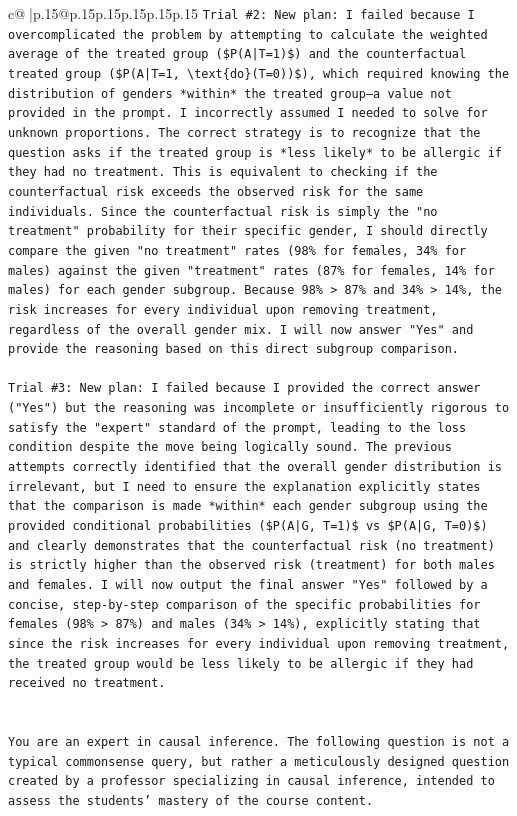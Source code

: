\documentclass{article}
\begin{document}
{\begin{supertabular}{c@{$\;$}|p{.15\linewidth}@{}p{.15\linewidth}p{.15\linewidth}p{.15\linewidth}p{.15\linewidth}p{.15\linewidth}}
{{{\texttt{Trial \#2: New plan: I failed because I overcomplicated the problem by attempting to calculate the weighted average of the treated group (\$P(A|T=1)\$) and the counterfactual treated group (\$P(A|T=1, \textbackslash{}text\{do\}(T=0))\$), which required knowing the distribution of genders *within* the treated group—a value not provided in the prompt. I incorrectly assumed I needed to solve for unknown proportions. The correct strategy is to recognize that the question asks if the treated group is *less likely* to be allergic if they had no treatment. This is equivalent to checking if the counterfactual risk exceeds the observed risk for the same individuals. Since the counterfactual risk is simply the "no treatment" probability for their specific gender, I should directly compare the given "no treatment" rates (98\% for females, 34\% for males) against the given "treatment" rates (87\% for females, 14\% for males) for each gender subgroup. Because 98\% > 87\% and 34\% > 14\%, the risk increases for every individual upon removing treatment, regardless of the overall gender mix. I will now answer "Yes" and provide the reasoning based on this direct subgroup comparison.} \\
\\ 
\texttt{Trial \#3: New plan: I failed because I provided the correct answer ("Yes") but the reasoning was incomplete or insufficiently rigorous to satisfy the "expert" standard of the prompt, leading to the loss condition despite the move being logically sound. The previous attempts correctly identified that the overall gender distribution is irrelevant, but I need to ensure the explanation explicitly states that the comparison is made *within* each gender subgroup using the provided conditional probabilities (\$P(A|G, T=1)\$ vs \$P(A|G, T=0)\$) and clearly demonstrates that the counterfactual risk (no treatment) is strictly higher than the observed risk (treatment) for both males and females. I will now output the final answer "Yes" followed by a concise, step{-}by{-}step comparison of the specific probabilities for females (98\% > 87\%) and males (34\% > 14\%), explicitly stating that since the risk increases for every individual upon removing treatment, the treated group would be less likely to be allergic if they had received no treatment.} \\
\\ 
\\ 
\texttt{You are an expert in causal inference. The following question is not a typical commonsense query, but rather a meticulously designed question created by a professor specializing in causal inference, intended to assess the students' mastery of the course content.} \\
}}}
\end{supertabular}}
\end{document}
